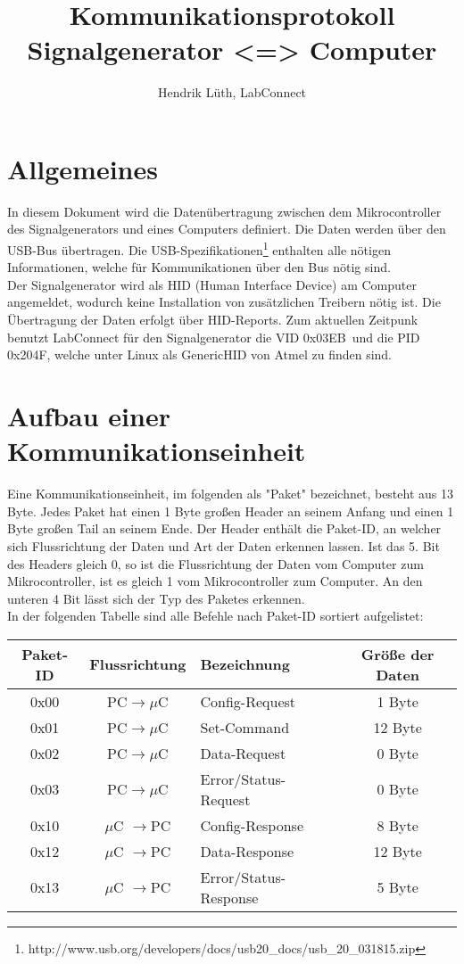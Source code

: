 \documentclass[a4paper,12pt]{article}
\title{Kommunikationsprotokoll \\Signalgenerator <=> Computer}
\author{Hendrik Lüth, LabConnect}
\newcommand{\VID}{0x03EB}
\newcommand{\PID}{0x204F}
\begin{document}
\maketitle
\tableofcontents
\pagebreak

\section{Allgemeines}
In diesem Dokument wird die Datenübertragung zwischen dem Mikrocontroller des Signalgenerators und eines Computers definiert. Die Daten werden über den USB-Bus übertragen. Die USB-Spezifikationen\footnote{http://www.usb.org/developers/docs/usb20\_docs/usb\_20\_031815.zip} enthalten alle nötigen Informationen, welche für Kommunikationen über den Bus nötig sind.\\
Der Signalgenerator wird als HID (Human Interface Device) am Computer angemeldet, wodurch keine Installation von zusätzlichen Treibern nötig ist. Die Übertragung der Daten erfolgt über HID-Reports. Zum aktuellen Zeitpunk benutzt LabConnect für den Signalgenerator die VID \VID\ und die PID \PID, welche unter Linux als GenericHID von Atmel zu finden sind.

\section{Aufbau einer Kommunikationseinheit}
Eine Kommunikationseinheit, im folgenden als "Paket" bezeichnet, besteht aus 13 Byte. Jedes Paket hat einen 1 Byte großen Header an seinem Anfang und einen 1 Byte großen Tail an seinem Ende. Der Header enthält die Paket-ID, an welcher sich Flussrichtung der Daten und Art der Daten erkennen lassen. Ist das 5. Bit des Headers gleich 0, so ist die Flussrichtung der Daten vom Computer zum Mikrocontroller, ist es gleich 1 vom Mikrocontroller zum Computer. An den unteren 4 Bit lässt sich der Typ des Paketes erkennen.\\
In der folgenden Tabelle sind alle Befehle nach Paket-ID sortiert aufgelistet:\\

\begin{tabular}{c|c|l|c}
Paket-ID & Flussrichtung & Bezeichnung & Größe der Daten \\ 
\hline 
0x00 & PC$\rightarrow \mu$C & Config-Request & 1 Byte \\ 
\hline 
0x01 & PC$\rightarrow \mu$C & Set-Command & 12 Byte \\ 
\hline 
0x02 & PC$\rightarrow \mu$C & Data-Request & 0 Byte \\ 
\hline 
0x03 & PC$\rightarrow \mu$C & Error/Status-Request & 0 Byte \\ 
\hline 
0x10 & $\mu$C $\rightarrow$PC & Config-Response & 8 Byte \\  
\hline 
0x12 & $\mu$C $\rightarrow$PC & Data-Response & 12 Byte \\ 
\hline
0x13 & $\mu$C $\rightarrow$PC & Error/Status-Response & 5 Byte \\ 
\end{tabular}
\end{document}
